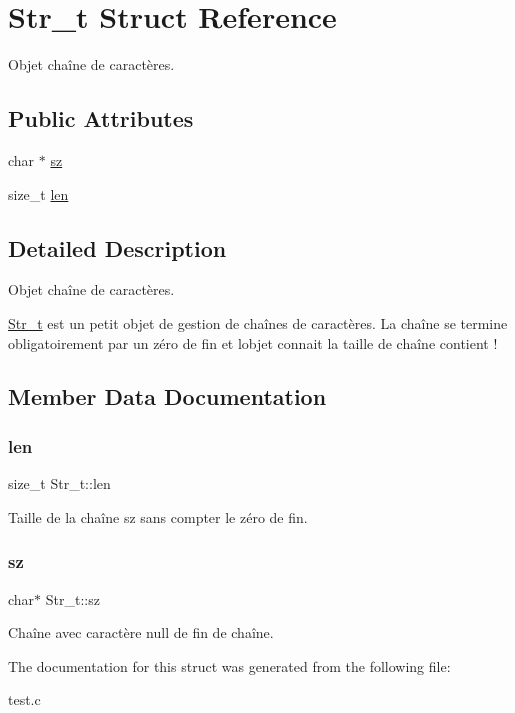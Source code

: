 \hypertarget{structStr__t}{}\section{Str\+\_\+t Struct Reference}
\label{structStr__t}


Objet chaîne de caractères.  


\subsection*{Public Attributes}
\begin{DoxyCompactItemize}
\item 
char $\ast$ \mbox{\hyperlink{structStr__t_ab94674acae4352eea6a92d6416dba8a6}{sz}}
\item 
size\+\_\+t \mbox{\hyperlink{structStr__t_a8ffa500232897558c615a93437b11e20}{len}}
\end{DoxyCompactItemize}


\subsection{Detailed Description}
Objet chaîne de caractères. 

\mbox{\hyperlink{structStr__t}{Str\+\_\+t}} est un petit objet de gestion de chaînes de caractères. La chaîne se termine obligatoirement par un zéro de fin et l\textquotesingle{}objet connait la taille de chaîne contient ! 

\subsection{Member Data Documentation}
\mbox{\label{structStr__t_a8ffa500232897558c615a93437b11e20}} 
\subsubsection{\texorpdfstring{len}{len}}
{\footnotesize\ttfamily size\+\_\+t Str\+\_\+t\+::len}

Taille de la chaîne sz sans compter le zéro de fin. \mbox{\label{structStr__t_ab94674acae4352eea6a92d6416dba8a6}} 
\subsubsection{\texorpdfstring{sz}{sz}}
{\footnotesize\ttfamily char$\ast$ Str\+\_\+t\+::sz}

Chaîne avec caractère null de fin de chaîne. 

The documentation for this struct was generated from the following file\+:\begin{DoxyCompactItemize}
\item 
test.\+c\end{DoxyCompactItemize}
